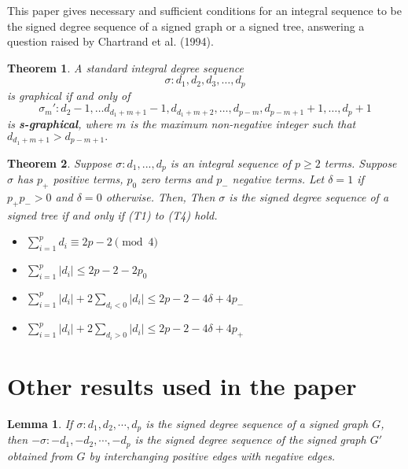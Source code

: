 \documentclass{article}
\newtheorem{theorem}{Theorem}
\newtheorem{lemma}{Lemma}
\begin{document}
This paper gives necessary and sufficient conditions for an integral sequence
to be the signed degree sequence of a signed graph or a signed tree, answering a
question raised by Chartrand et al. (1994). 

\addtocounter{theorem}{2}

\begin{theorem}
    A standard integral degree sequence 
    \begin{equation}
        \sigma: d_1,d_2,d_3,\ldots, d_p
    \end{equation}
is graphical if and only of 
\begin{equation*}
    \sigma_m':d_2-1,\ldots d_{d_1+m+1}-1,d_{d_1+m+2},\ldots, d_{p-m},d_{p-m+1}+1,\ldots,d_p+1
\end{equation*}
 is \textbf{s-graphical}, where $m$ is the maximum non-negative integer such that $d_{d_1+m+1}>d_{p-m+1}.$
\end{theorem}

\addtocounter{theorem}{3}

\begin{theorem}
    Suppose $\sigma : d_1,...,d_p$ is an integral sequence of $p \geq 2$ terms. Suppose $\sigma$ has $p_+$ positive terms, $p_0$ zero terms and $p_-$ negative terms. Let $\delta = 1$ if $p_+p_- > 0$ and $\delta = 0$ otherwise. Then, Then $\sigma$ is the signed degree sequence of a signed tree if and only if (T1) to (T4) hold.
        \begin{itemize}
            \item[(T1)] $\sum_{i = 1}^{p} d_i \equiv 2p - 2 \pmod 4$
            \item[(T2)] $\sum_{i = 1}^{p} \lvert d_i \rvert \le 2p - 2 - 2p_0$
            \item[(T3)] $\sum_{i = 1}^{p} \lvert d_i \rvert + 2\sum_{d_i < 0} \lvert d_i \rvert \leq 2p - 2 - 4\delta + 4p_-$
            \item[(T4)] $\sum_{i = 1}^{p} \lvert d_i \rvert + 2\sum_{d_i > 0} \lvert d_i \rvert \leq 2p - 2 - 4\delta + 4p_+$
        \end{itemize}
\end{theorem}

\newpage

\section{Other results used in the paper}

\begin{lemma}
    If \(\sigma: d_1, d_2,\cdots,d_p\) is the signed degree sequence of a signed graph \(G\), then \(-\sigma: -d_1, -d_2,\cdots,-d_p\) is the signed degree sequence of the signed graph \(G'\) obtained from \(G\) by interchanging positive edges with negative edges.
\end{lemma}
\end{document}

